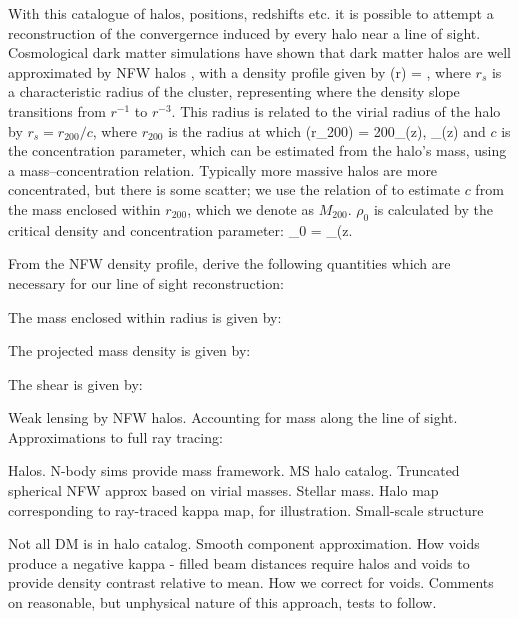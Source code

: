 \documentclass[useAMS,usenatbib]{mn2e}
\begin{document}
With this catalogue of halos, positions, redshifts etc. it is possible to attempt
a reconstruction of the convergernce induced by every halo near a line of sight.
Cosmological dark matter simulations have shown that dark matter halos are well
approximated by NFW halos \citep{NFW1997}, with a density profile given by
\be\label{eq:rhonfw}
\rho(r) = 
,
\ee
where $r_{s}$ is a characteristic radius of the cluster, representing where
the density slope transitions from $r^{-1}$ to $r^{-3}$. This radius is related
to the virial radius of the halo by $r_{s} = r_{200}/c$, where $r_{200}$ is the radius at 
which 
\be
\rho(r_{200}) = 200\rho_{{}}(z),  \rho_{}(z) \equiv {}
\ee
 and $c$ is the concentration parameter, which can be estimated from the halo's mass,
using a mass--concentration relation. Typically more massive halos are more concentrated,
but there is some scatter; we use the relation of \citet{neto2007} to estimate $c$
from the mass enclosed within $r_{200}$, which we denote as $M_{200}$. $\rho_0$ is calculated 
by the critical density and concentration parameter:
\be
\rho_0 = \rho_{}(z.
\ee

From the NFW density profile, \citet{wrightbrainerd1999} derive the following quantities
which are necessary for our line of sight reconstruction:

The mass enclosed within radius is given by:

The projected mass density is given by:

The shear is given by:






Weak lensing by NFW halos. Accounting for mass along the line of sight.
Approximations to full ray tracing:

Halos. N-body sims provide mass framework. MS halo catalog. Truncated spherical
NFW approx based on virial masses. Stellar mass. Halo map corresponding to
ray-traced kappa map, for illustration. Small-scale structure 

Not all DM is in halo catalog. Smooth component approximation.  How voids
produce a negative kappa - filled beam distances require halos and voids to
provide density contrast relative to mean. How we correct for voids. Comments on
reasonable, but unphysical nature of this approach, tests to follow. 


\end{document}
